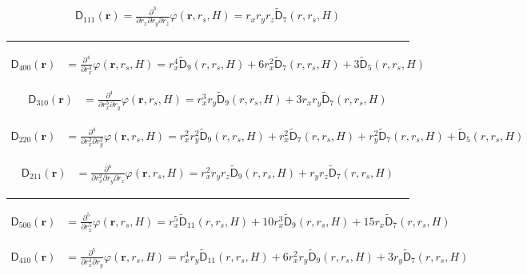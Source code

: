 \begin{align}
\mathsf{D}_{111}(\mathbf{r}) = \frac{\partial^3}{\partial r_x\partial r_y\partial r_z} \varphi (\mathbf{r}, r_s, H) = 
  r_x r_y r_z \mathsf{\tilde{D}}_{7}(r, r_s, H) \nonumber
\end{align}

\noindent\rule{6cm}{0.4pt}
\begin{align}
  \mathsf{D}_{400}(\mathbf{r}) &= \frac{\partial^4}{\partial r_x^4}
  \varphi (\mathbf{r}, r_s, H) =
  r_x^4 \mathsf{\tilde{D}}_{9}(r, r_s, H)+
  6r_x^2 \mathsf{\tilde{D}}_{7}(r, r_s, H) +
  3 \mathsf{\tilde{D}}_{5}(r, r_s, H)
  \nonumber
\end{align}

\begin{align}
  \mathsf{D}_{310}(\mathbf{r}) &= \frac{\partial^4}{\partial r_x^3
    \partial r_y} \varphi (\mathbf{r}, r_s, H) =
  r_x^3 r_y \mathsf{\tilde{D}}_{9}(r, r_s, H) +
  3 r_x r_y \mathsf{\tilde{D}}_{7}(r, r_s, H)
  \nonumber
\end{align}

\begin{align}
  \mathsf{D}_{220}(\mathbf{r}) &= \frac{\partial^4}{\partial r_x^2
    \partial r_y^2} \varphi (\mathbf{r}, r_s, H) =
    r_x^2 r_y^2 \mathsf{\tilde{D}}_{9}(r, r_s, H) +
    r_x^2 \mathsf{\tilde{D}}_{7}(r, r_s, H) +
    r_y^2 \mathsf{\tilde{D}}_{7}(r, r_s, H) +
    \mathsf{\tilde{D}}_{5}(r, r_s, H)
  \nonumber
\end{align}

\begin{align}
  \mathsf{D}_{211}(\mathbf{r}) &= \frac{\partial^4}{\partial r_x^2
    \partial r_y   \partial r_z} \varphi (\mathbf{r}, r_s, H) =
    r_x^2 r_y r_z \mathsf{\tilde{D}}_{9}(r, r_s, H) +
    r_y r_z \mathsf{\tilde{D}}_{7}(r, r_s, H)
  \nonumber
\end{align}

\noindent\rule{6cm}{0.4pt}
\begin{align}
  \mathsf{D}_{500}(\mathbf{r}) &= \frac{\partial^5}{\partial r_x^5}
  \varphi (\mathbf{r}, r_s, H) =
  r_x^5 \mathsf{\tilde{D}}_{11}(r, r_s, H) +
  10r_x^3\mathsf{\tilde{D}}_{9}(r, r_s, H) +
  15r_x\mathsf{\tilde{D}}_{7}(r, r_s, H)
  \nonumber
\end{align}

\begin{align}
  \mathsf{D}_{410}(\mathbf{r}) &= \frac{\partial^5}{\partial r_x^4
    \partial r_y} \varphi (\mathbf{r}, r_s, H) =
  r_x^4 r_y \mathsf{\tilde{D}}_{11}(r, r_s, H) +
  6 r_x^2 r_y \mathsf{\tilde{D}}_{9}(r, r_s, H) + 
  3 r_y \mathsf{\tilde{D}}_{7}(r, r_s, H)
  \nonumber
\end{align}

